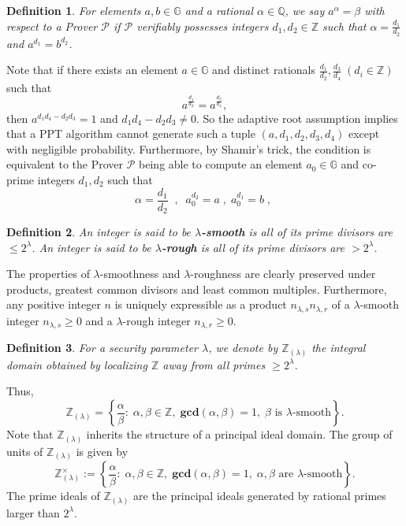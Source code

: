 \documentclass[11pt, lettersize, notitlepage, leqno, footskip=0.6cm]{article}
\newcommand{\bz}{\mathbb Z}
\newcommand{\bq}{\mathbb Q}
\newcommand{\mc}{\mathcal}
\newcommand{\mb}{\mathbb}
\newcommand{\mbf}{\mathbf}
\newcommand{\al}{\alpha}
\newcommand{\be}{\beta}
\newcommand{\lam}{\lambda}
\newcommand{\lamb}{\lambda}
\newcommand{\bzlam}{\bz_{(\lam)}}
\newcommand{\mP}{\mc{P}}
\newcommand{\vs}{\vspace{-0.15cm}}
\newcommand{\noin}{\noindent}
\newcommand{\GCD}{\mbf{gcd}}
\newtheorem{Def}{Definition}[section]
\numberwithin{equation}{section}
\begin{document}
\begin{Def} For elements $a, b\in\mb{G}$ and a rational $\al\in\bq$, we say $a^{\al} = \be$ with respect to a Prover $\mP$ if $\mP$ verifiably possesses integers $d_1,d_2\in\bz$ such that $\al = \frac{d_1}{d_2}$ and  $a^{d_1} = b^{d_2}$.\end{Def}

\noin Note that if there exists an element $a\in\mb{G}$ and distinct rationals $\frac{d_1}{d_2}, \frac{d_3}{d_4}\;(d_i\in\bz)$ such that \vs $$a^{\frac{d_1}{d_2}} = a^{\frac{d_3}{d_4}},$$ then $a^{d_1d_4-d_2d_3} = 1$ and $d_1d_4-d_2d_3\neq 0$. So the adaptive root assumption implies that a PPT algorithm cannot generate such a tuple $(a,d_1,d_2,d_3,d_4)$ except with negligible probability. Furthermore, by Shamir's trick, the condition is equivalent to the Prover $\mP$ being able to compute an element $a_0\in\mb{G}$ and co-prime integers $d_1,d_2$ such that \vs $$\al = \frac{d_1}{d_2}\;\;,\;\;a_0^{d_2} =a\;,\; a_0^{d_1} =b\;,\; $$


\begin{Def} An integer is said to be \textbf{$\lamb$-smooth} is all of its prime divisors are $\leq 2^{\lamb}$. An integer is said to be \textbf{$\lamb$-rough} is all of its prime divisors are $> 2^{\lamb}$.\end{Def}

\noindent The properties of $\lamb$-smoothness and $\lamb$-roughness are clearly preserved under products, greatest common divisors and least common multiples. Furthermore, any positive integer $n$ is uniquely expressible as a product $n_{{\lam,s}}n_{{\lam,r}}$ of a $\lam$-smooth integer $n_{{\lam,s}}\geq 0$ and a $\lam$-rough integer $n_{{\lam,r}}\geq 0$.

\begin{Def} For a security parameter $\lamb$, we denote by $\bz_{(\lamb)}$ the integral domain obtained by localizing $\bz$ away from all primes $\geq 2^{\lamb}$. \end{Def}

\noindent Thus, \vs $$\bz_{(\lamb)} = \left\{\frac{\al}{\be}:\; \al,\be\in\bz,\;\GCD(\al,\be) = 1,\; \be \text{ is } \lamb\text{-smooth}\right\}.$$ Note that $\bz_{(\lamb)}$ inherits the structure of a principal ideal domain. The group of units of $\bzlam$ is given by $$\bzlam^{\times} := \left\{\frac{\al}{\be}:\; \al,\be\in\bz,\;\GCD(\al,\be) = 1,\; \al, \be \text{ are } \lamb\text{-smooth}\right\}. $$ The prime ideals of $\bz_{(\lamb)}$ are the principal ideals generated by rational primes larger than $2^{\lamb}$.
\end{document}
